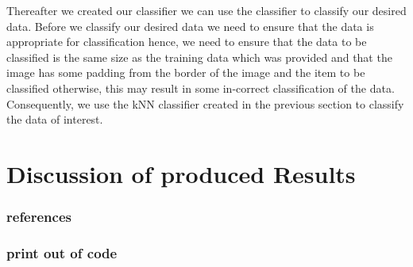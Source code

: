 \documentclass[
	12pt, %
]{fphw}
\begin{document}
Thereafter we created our classifier we can use the classifier to classify our desired data. Before we classify our desired data we need to ensure that the data is appropriate for classification hence, we need to ensure that the data to be classified is the same size as the training data which was provided and that the image has some padding from the border of the image and the item to be classified otherwise, this may result in some in-correct classification of the data. Consequently, we use the kNN classifier created in the previous section to classify the data of interest.

\newpage
\part{Discussion of produced Results}
\newpage

\section{references}

\newpage
\appendix
\appendixpage
\addappheadtotoc

\section{print out of code}
%







%
\end{document}
